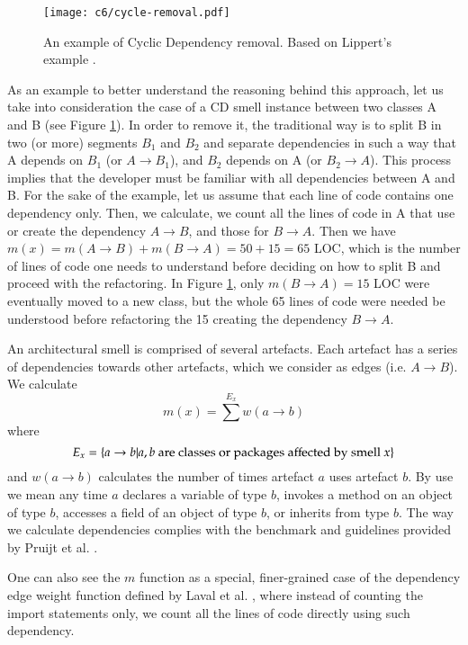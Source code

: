 \begin{figure}[]
    \centering
    \texttt{[image: c6/cycle-removal.pdf]}
    \caption{An example of Cyclic Dependency removal. Based on Lippert's example \cite[p. 128]{Lippert2006}.}
    \label{c6:fig:cd-removal}
\end{figure}

As an example to better understand the reasoning behind this approach, let us take into consideration the case of a CD smell instance between two classes A and B (see Figure \ref{c6:fig:cd-removal}). In order to remove it, the traditional way \cite[p. 128]{Lippert2006} is to split B in two (or more) segments $B_1$ and $B_2$ and separate dependencies in such a way that A depends on $B_1$ (or $A \rightarrow B_1$), and $B_2$ depends on A (or $B_2 \rightarrow A$).
This process implies that the developer must be familiar with all dependencies between A and B. For the sake of the example, let us assume that each line of code contains one dependency only. Then, we calculate, we count all the lines of code in A that use or create the dependency $A \rightarrow B$, and those for $B \rightarrow A$. Then we have $m(x) = m(A \rightarrow B) + m(B \rightarrow A) = 50 + 15 = 65$ LOC, which is the number of lines of code one needs to understand before deciding on how to split B and proceed with the refactoring. In Figure \ref{c6:fig:cd-removal}, only $m(B \rightarrow A) = 15$ LOC were eventually moved to a new class, but the whole 65 lines of code were needed be understood before refactoring the 15 creating the dependency $B \rightarrow A$.

An architectural smell is comprised of several artefacts. Each artefact has a series of dependencies towards other artefacts, which we consider as edges (i.e. $A \rightarrow B$). We calculate 
\begin{equation}\label{c6:eq:smell-extent-dependency}
    m(x) = \sum^{E_x} w(a \rightarrow b)
\end{equation}
where $$E_x = \{a \rightarrow b | a,b\textnormal{ are classes or packages affected by smell } x\}$$ and $w(a\rightarrow b)$ calculates the number of times artefact $a$ uses artefact $b$. 
By use we mean any time $a$ declares a variable of type $b$, invokes a method on an object of type $b$, accesses a field of an object of type $b$, or inherits from type $b$.
The way we calculate dependencies complies with the benchmark and guidelines provided by Pruijt et al. \cite{Pruijt2017}.

One can also see the $m$ function as a special, finer-grained case of the dependency edge weight function defined by Laval et al. \cite{Laval2012}, where instead of counting the import statements only, we count all the lines of code directly using such dependency.

